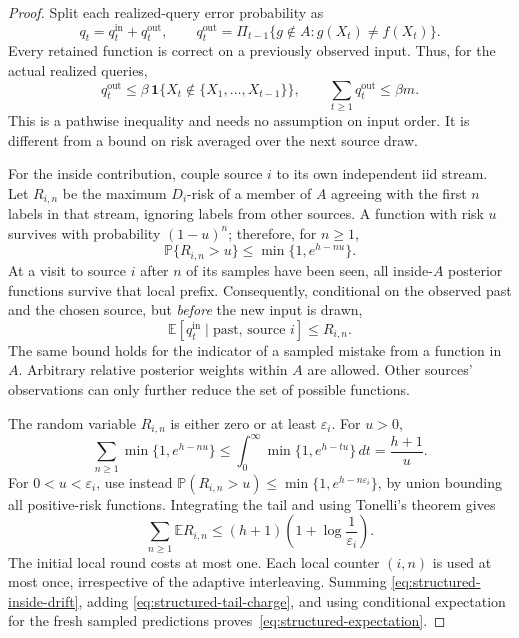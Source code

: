 \begin{proof}
Split each realized-query error probability as
\[
 q_t=q_t^{\mathrm{in}}+q_t^{\mathrm{out}},\qquad
 q_t^{\mathrm{out}}=
 \Pi_{t-1}\{g\notin A:g(X_t)\ne f(X_t)\}.
\]
Every retained function is correct on a previously observed input.
Thus, for the actual realized queries,
\begin{equation}\label{eq:structured-tail-charge}
 q_t^{\mathrm{out}}\le
 \beta\,\mathbf1\{X_t\notin\{X_1,\ldots,X_{t-1}\}\},
 \qquad \sum_{t\ge1}q_t^{\mathrm{out}}\le\beta m.
\end{equation}
This is a pathwise inequality and needs no assumption on input order.
It is different from a bound on risk averaged over the next source draw.

For the inside contribution, couple source $i$ to its own independent iid
stream. Let $R_{i,n}$ be the maximum $D_i$-risk of a member of $A$ agreeing
with the first $n$ labels in that stream, ignoring labels from other
sources. A function with risk $u$ survives with probability $(1-u)^n$;
therefore, for $n\ge1$,
\begin{equation}\label{eq:structured-prefix-tail}
 \mathbb P\{R_{i,n}>u\}\le\min\{1,e^{h-nu}\}.
\end{equation}
At a visit to source $i$ after $n$ of its samples have been seen, all
inside-$A$ posterior functions survive that local prefix. Consequently,
conditional on the observed past and the chosen source, but \emph{before}
the new input is drawn,
\begin{equation}\label{eq:structured-inside-drift}
 \mathbb E[q_t^{\mathrm{in}}\mid\text{past, source }i]
 \le R_{i,n}.
\end{equation}
The same bound holds for the indicator of a sampled mistake from a
function in $A$. Arbitrary relative posterior weights within $A$ are
allowed. Other sources' observations can only further reduce the set of
possible functions.

The random variable $R_{i,n}$ is either zero or at least
$\varepsilon_i$. For $u>0$,
\[
 \sum_{n\ge1}\min\{1,e^{h-nu}\}
 \le\int_0^\infty\min\{1,e^{h-tu}\}\,dt=\frac{h+1}{u}.
\]
For $0<u<\varepsilon_i$, use instead
$\mathbb P(R_{i,n}>u)\le\min\{1,e^{h-n\varepsilon_i}\}$,
by union bounding all positive-risk functions. Integrating the tail and
using Tonelli's theorem gives
\[
 \sum_{n\ge1}\mathbb E R_{i,n}
 \le(h+1)\left(1+\log\frac1{\varepsilon_i}\right).
\]
The initial local round costs at most one. Each local counter $(i,n)$ is
used at most once, irrespective of the adaptive interleaving. Summing
\eqref{eq:structured-inside-drift}, adding
\eqref{eq:structured-tail-charge}, and using conditional expectation for
the fresh sampled predictions proves~\eqref{eq:structured-expectation}.


\end{proof}
